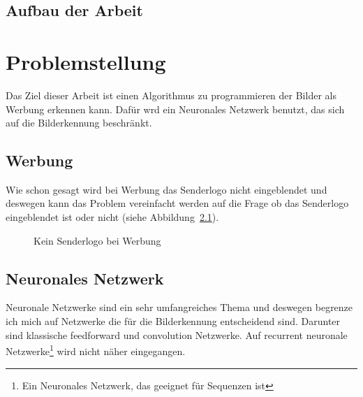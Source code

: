 \documentclass[12pt,a4paper]{report}
\begin{document}
\section{Aufbau der Arbeit}
\label{sec:aufbauDerArbeit}

\chapter{Problemstellung}
Das Ziel dieser Arbeit ist einen Algorithmus zu programmieren der Bilder als Werbung erkennen kann.
Dafür wrd ein Neuronales Netzwerk benutzt, das sich auf die Bilderkennung beschränkt.
\section{Werbung}
Wie schon gesagt wird bei Werbung das Senderlogo nicht eingeblendet und deswegen kann das Problem
vereinfacht werden auf die Frage ob das Senderlogo eingeblendet ist oder nicht (siehe Abbildung~\ref{fig:logo1}).

\begin{figure}[h]%
    \centering
    \qquad
    \caption{Kein Senderlogo bei Werbung}%
    \label{fig:logo1}%
\end{figure}

\section{Neuronales Netzwerk}
Neuronale Netzwerke sind ein sehr umfangreiches Thema und deswegen begrenze ich mich auf Netzwerke die für die Bilderkennung entscheidend sind.
Darunter sind klassische feedforward und convolution Netzwerke.
Auf recurrent neuronale Netzwerke\footnote{Ein Neuronales Netzwerk, das geeignet für Sequenzen ist} wird nicht näher eingegangen.
\end{document}
